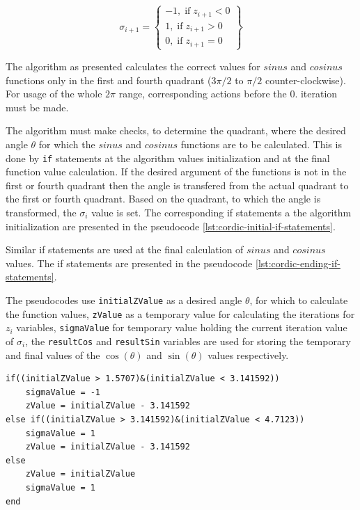 \documentclass[a4paper, twoside, 11pt]{article}
\begin{document}
            \begin{equation}
                \sigma_{i+1} = 
                \left\{
                \begin{array}{lr}
                    -1,\;\text{if}\;z_{i+1} < 0\\
                    1,\;\text{if}\;z_{i+1} > 0\\
                    0,\;\text{if}\;z_{i+1} = 0
                \end{array}
                \right\}
            \end{equation}
            \par
            The algorithm as presented calculates the correct values for $sinus$ and $cosinus$ functions only in the first and fourth quadrant ($3\pi/2$ to $\pi/2$ counter-clockwise). For usage of the whole $2\pi$ range, corresponding actions before the 0. iteration must be made.\par
            The algorithm must make checks, to determine the quadrant, where the desired angle $\theta$ for which the $sinus$ and $cosinus$ functions are to be calculated. This is done by \texttt{if} statements at the algorithm values initialization and at the final function value calculation. If the desired argument of the functions is not in the first or fourth quadrant then the angle is transfered from the actual quadrant to the first or fourth quadrant. Based on the quadrant, to which the angle is transformed, the $\sigma_i$ value is set. The corresponding if statements a the algorithm initialization are presented in the pseudocode \ref{lst:cordic-initial-if-statements}.\par
            Similar if statements are used at the final calculation of $sinus$ and $cosinus$ values. The if statements are presented in the pseudocode \ref{lst:cordic-ending-if-statements}.\par
            The pseudocodes use \texttt{initialZValue} as a desired angle $\theta$, for which to calculate the function values, \texttt{zValue} as a temporary value for calculating the iterations for $z_{i}$ variables, \texttt{sigmaValue} for temporary value holding the current iteration value of $\sigma_i$, the \texttt{resultCos} and \texttt{resultSin} variables are used for storing the temporary and final values of the $\cos (\theta)$ and $\sin (\theta)$ values respectively.

\begin{lstlisting}[language={pseudocode}, caption={Pseudocode for if statements used at the value initialization of the \gls{abbreviation:cordic} algorithm.}, label= {lst:cordic-initial-if-statements}]
if((initialZValue > 1.5707)&(initialZValue < 3.141592))
    sigmaValue = -1
    zValue = initialZValue - 3.141592
else if((initialZValue > 3.141592)&(initialZValue < 4.7123))
    sigmaValue = 1
    zValue = initialZValue - 3.141592
else
    zValue = initialZValue
    sigmaValue = 1
end
\end{lstlisting}
\end{document}

